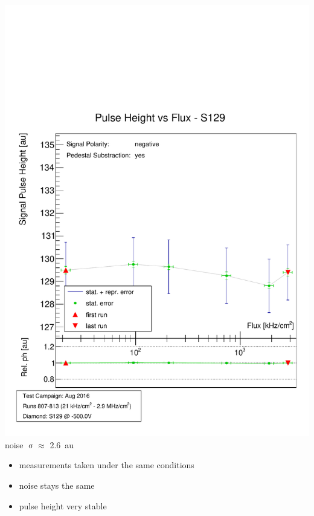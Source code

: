 \documentclass[9pt]{beamer}
\begin{document}
\begin{frame}
\begin{minipage}{\sp}
		\includegraphics[width=\sp]{CPH1510_18_1}\\
		noise $\upsigma \approx$ \SI{2.6}{au}
	\end{minipage}\s
	\begin{itemize}
		\item measurements taken under the same conditions
		\item noise stays the same
		\item pulse height very stable
	\end{itemize}
\end{frame}
\end{document}
